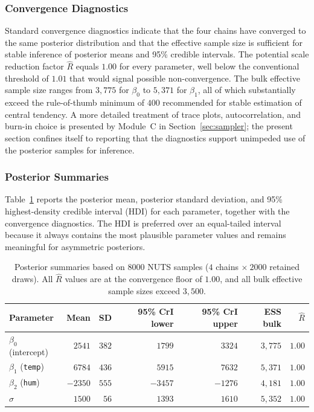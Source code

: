 \subsubsection{Convergence Diagnostics}

Standard convergence diagnostics indicate that the four chains have converged to the same posterior distribution and that the effective sample size is sufficient for stable inference of posterior means and 95\% credible intervals. The potential scale reduction factor $\hat{R}$ equals $1.00$ for every parameter, well below the conventional threshold of $1.01$ that would signal possible non-convergence. The bulk effective sample size ranges from $3{,}775$ for $\beta_0$ to $5{,}371$ for $\beta_1$, all of which substantially exceed the rule-of-thumb minimum of $400$ recommended for stable estimation of central tendency. A more detailed treatment of trace plots, autocorrelation, and burn-in choice is presented by Module~C in Section~\ref{sec:sampler}; the present section confines itself to reporting that the diagnostics support unimpeded use of the posterior samples for inference.

\subsubsection{Posterior Summaries}

Table~\ref{tab:posterior} reports the posterior mean, posterior standard deviation, and 95\% highest-density credible interval (HDI) for each parameter, together with the convergence diagnostics. The HDI is preferred over an equal-tailed interval because it always contains the most plausible parameter values and remains meaningful for asymmetric posteriors.

\begin{table}[htbp]
\centering
\caption{Posterior summaries based on $8000$ NUTS samples ($4$ chains $\times\ 2000$ retained draws). All $\hat{R}$ values are at the convergence floor of $1.00$, and all bulk effective sample sizes exceed $3{,}500$.}
\label{tab:posterior}
\begin{tabular}{lrrrrrr}
\hline
Parameter & Mean & SD & 95\% CrI lower & 95\% CrI upper & ESS bulk & $\hat{R}$ \\
\hline
$\beta_0$ (intercept)     & $2541$  & $382$ & $1799$  & $3324$  & $3{,}775$ & $1.00$ \\
$\beta_1$ (\texttt{temp}) & $6784$  & $436$ & $5915$  & $7632$  & $5{,}371$ & $1.00$ \\
$\beta_2$ (\texttt{hum})  & $-2350$ & $555$ & $-3457$ & $-1276$ & $4{,}181$ & $1.00$ \\
$\sigma$                  & $1500$  & $\phantom{0}56$ & $1393$  & $1610$  & $5{,}352$ & $1.00$ \\
\hline
\end{tabular}
\end{table}

